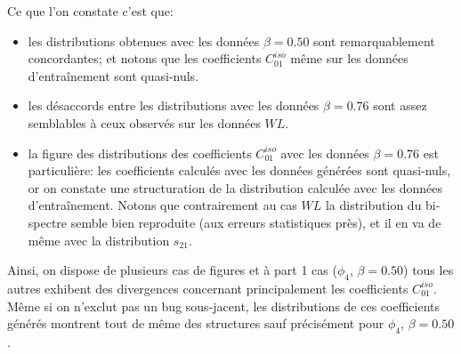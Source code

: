 \documentclass[12pt,twoside]{article}
\newcommand{\itemb}{\item[$\bullet$]}
\begin{document}
Ce que l'on constate c'est que:
\begin{itemize}
\itemb les distributions obtenues avec les données $\beta=0.50$ sont remarquablement concordantes; et notons que les coefficients $C_{01}^{iso}$ même sur les données d'entraînement sont quasi-nuls.
\itemb les désaccords entre les distributions avec les données $\beta=0.76$ sont assez semblables à ceux observés sur les données $WL$.
\itemb la figure des distributions des coefficients $C_{01}^{iso}$ avec les données $\beta=0.76$ est particulière: les coefficients calculés avec les données générées sont quasi-nuls, or on constate une structuration de la distribution calculée avec les données d'entraînement. Notons que contrairement au cas $WL$ la distribution du bi-spectre semble bien reproduite (aux erreurs statistiques près), et il en va de même avec la distribution $s_{21}$.
\end{itemize}
Ainsi, on dispose de plusieurs cas de figures et à part 1 cas ($\phi_4$, $\beta=0.50$) tous les autres exhibent des divergences concernant principalement les coefficients $C_{01}^{iso}$. Même si on n'exclut pas un bug sous-jacent, les distributions de ces coefficients générés montrent tout de même des structures sauf précisément pour $\phi_4$, $\beta=0.50$.
\end{document}

